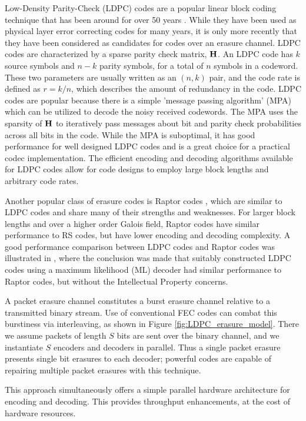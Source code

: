 \documentclass[conference]{IEEEtran}
\begin{document}
Low-Density Parity-Check (LDPC) codes are a popular linear block coding technique that has been around for over 50 years \cite{Gallager-62}.  While they have been used as physical layer error correcting codes for many years, it is only more recently that they have been considered as candidates for codes over an erasure channel.  LDPC codes are characterized by a sparse parity check matrix, $\bf{H}$.  An LDPC code has $k$ source symbols and $n-k$ parity symbols, for a total of $n$ symbols in a codeword.  These two parameters are usually written as an $(n, k)$ pair, and the code rate is defined as $r=k/n$, which describes the amount of redundancy in the code.  LDPC codes are popular because there is a simple 'message passing algorithm' (MPA) which can be utilized to decode the noisy received codewords.  The MPA uses the sparsity of $\bf{H}$ to iteratively pass messages about bit and parity check probabilities across all bits in the code.  While the MPA is suboptimal, it has good performance for well designed LDPC codes and is a great choice for a practical codec implementation.  The efficient encoding and decoding algorithms available for LDPC codes allow for code designs to employ large block lengths and arbitrary code rates.

Another popular class of erasure codes is Raptor codes \cite{Shokrollahi-06}, which are similar to LDPC codes and share many of their strengths and weaknesses.  For larger block lengths and over a higher order Galois field, Raptor codes have similar performance to RS codes, but have lower encoding and decoding complexity.  A good performance comparison between LDPC codes and Raptor codes was illustrated in \cite{Roca-2013}, where the conclusion was made that suitably constructed LDPC codes using a maximum likelihood (ML) decoder had similar performance to Raptor codes, but without the Intellectual Property concerns.

A packet erasure channel constitutes a burst erasure channel relative to a transmitted binary stream.  Use of conventional FEC codes can combat this burstiness via interleaving, as shown
in Figure \ref{fig:LDPC_erasure_model}.  There we assume packets of length $S$ bits are sent over the binary channel, and we
instantiate $S$ encoders and decoders in parallel.  Thus a single packet erasure presents single
bit erasures to each decoder; powerful codes are capable of repairing multiple packet erasures
with this technique.

This approach simultaneously offers a simple parallel hardware architecture for encoding and decoding.  This provides throughput enhancements, at the cost of hardware resources.
\end{document}
